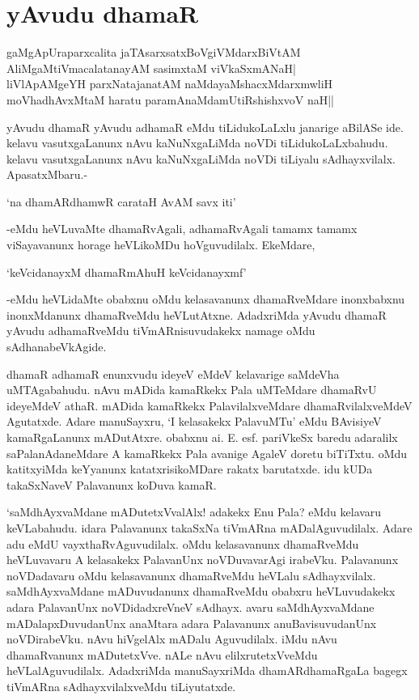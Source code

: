 \chapter{yAvudu dhamaR}

\begin{shloka}
gaMgApUraparxcalita jaTAsarxsatxBoVgiVMdarxBiVtAM\\
AliMgaMtiVmacalatanayAM sasimxtaM viVkaSxmANaH|\\
liVlApAMgeYH parxNatajanatAM naMdayaMshacxMdarxmwliH\\
moVhadhAvxMtaM haratu paramAnaMdamUtiRshishxvoV naH||
\end{shloka}

yAvudu dhamaR yAvudu adhamaR eMdu tiLidukoLaLxlu janarige aBilASe ide. kelavu vasutxgaLanunx nAvu kaNuNxgaLiMda noVDi tiLidukoLaLxbahudu. kelavu vasutxgaLanunx nAvu kaNuNxgaLiMda noVDi tiLiyalu sAdhayxvilalx. ApasatxMbaru.-

\begin{shloka}
`na dhamARdhamwR carataH AvAM savx iti'
\end{shloka}

-eMdu heVLuvaMte dhamaRvAgali, adhamaRvAgali tamamx tamamx viSayavanunx horage heVLikoMDu hoVguvudilalx. EkeMdare,

\begin{shloka}
`keVcidanayxM dhamaRmAhuH keVcidanayxmf'
\end{shloka}

-eMdu heVLidaMte obabxnu oMdu kelasavanunx dhamaRveMdare inonxbabxnu inonxMdanunx dhamaRveMdu heVLutAtxne. AdadxriMda yAvudu dhamaR yAvudu adhamaRveMdu tiVmARnisuvudakekx namage oMdu sAdhanabeVkAgide.

dhamaR adhamaR enunxvudu ideyeV eMdeV kelavarige saMdeVha uMTAgabahudu. nAvu mADida kamaRkekx Pala uMTeMdare dhamaRvU ideyeMdeV athaR. mADida kamaRkekx PalavilalxveMdare dhamaRvilalxveMdeV Agutatxde. Adare manuSayxru, `I kelasakekx PalavuMTu' eMdu BAvisiyeV kamaRgaLanunx mADutAtxre. obabxnu ai. E. esf. pariVkeSx baredu adaralilx saPalanAdaneMdare A kamaRkekx Pala avanige AgaleV doretu biTiTxtu. oMdu katitxyiMda keYyanunx katatxrisikoMDare rakatx barutatxde. idu kUDa takaSxNaveV Palavanunx koDuva kamaR. 

`saMdhAyxvaMdane mADutetxVvalAlx! adakekx Enu Pala? eMdu kelavaru keVLabahudu. idara Palavanunx takaSxNa tiVmARna mADalAguvudilalx. Adare adu eMdU vayxthaRvAguvudilalx. oMdu kelasavanunx dhamaRveMdu heVLuvavaru A kelasakekx PalavanUnx noVDuvavarAgi irabeVku. Palavanunx noVDadavaru oMdu kelasavanunx dhamaRveMdu heVLalu sAdhayxvilalx. saMdhAyxvaMdane mADuvudanunx dhamaRveMdu obabxru heVLuvudakekx adara PalavanUnx noVDidadxreVneV sAdhayx. avaru saMdhAyxvaMdane mADalapxDuvudanUnx anaMtara adara Palavanunx anuBavisuvudanUnx noVDirabeVku. nAvu hiVgelAlx mADalu Aguvudilalx. iMdu nAvu dhamaRvanunx mADutetxVve. nALe nAvu elilxrutetxVveMdu heVLalAguvudilalx. AdadxriMda manuSayxriMda dhamARdhamaRgaLa bagegx tiVmARna sAdhayxvilalxveMdu tiLiyutatxde.

